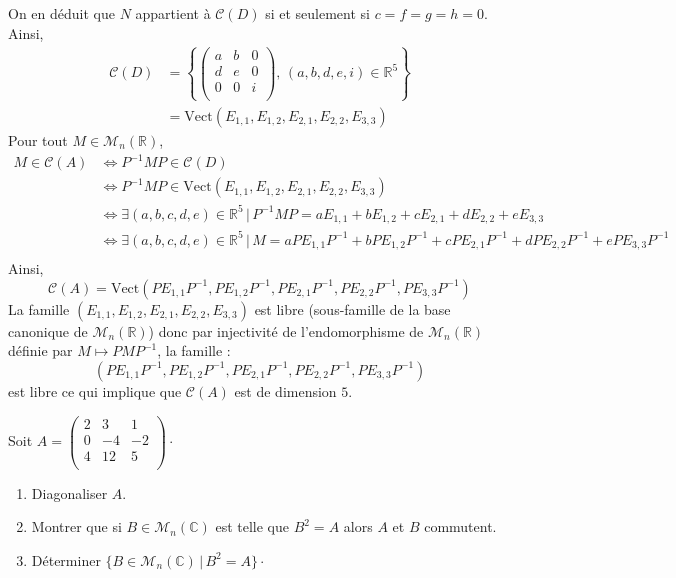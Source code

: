 \documentclass[a4paper,10pt]{report}
\begin{document}
\begin{enumerate}
On en déduit que $N$ appartient à $\mathcal{C}(D)$ si et seulement si $c=f=g=h=0$. Ainsi,
\begin{align*}
\mathcal{C}(D) & = \left\lbrace \begin{pmatrix}
a & b & 0 \\
d & e & 0 \\
0 & 0 & i \\
\end{pmatrix}, \, (a,b,d,e,i) \in \mathbb{R}^5 \right\rbrace \\
& = \textrm{Vect}(E_{1,1}, E_{1,2}, E_{2,1}, E_{2,2},E_{3,3})
\end{align*}
Pour tout $M \in \mathcal{M}_n(\mathbb{R})$,
\begin{align*}
M \in \mathcal{C}(A) & \Longleftrightarrow P^{-1}MP \in \mathcal{C}(D) \\
& \Longleftrightarrow  P^{-1}MP \in \textrm{Vect}(E_{1,1}, E_{1,2}, E_{2,1}, E_{2,2},E_{3,3}) \\
& \Longleftrightarrow \exists (a,b,c,d,e) \in \mathbb{R}^5 \, \vert \, P^{-1}MP = aE_{1,1}+bE_{1,2}+c E_{2,1}+d E_{2,2}+eE_{3,3} \\
& \Longleftrightarrow \exists (a,b,c,d,e) \in \mathbb{R}^5 \, \vert \, M = aPE_{1,1}P^{-1}+bPE_{1,2}P^{-1}+c PE_{2,1}P^{-1}+d PE_{2,2}P^{-1}+ePE_{3,3}P^{-1} \\
\end{align*}
Ainsi,
$$ \mathcal{C}(A) = \textrm{Vect}(PE_{1,1}P^{-1},PE_{1,2}P^{-1},PE_{2,1}P^{-1},PE_{2,2}P^{-1},PE_{3,3}P^{-1}) $$
La famille $(E_{1,1}, E_{1,2}, E_{2,1}, E_{2,2}, E_{3,3})$ est libre (sous-famille de la base canonique de $\mathcal{M}_n(\mathbb{R})$) donc par injectivité de l'endomorphisme de $\mathcal{M}_n(\mathbb{R})$ définie par $M \mapsto PMP^{-1}$, la famille :
$$(PE_{1,1}P^{-1},PE_{1,2}P^{-1},PE_{2,1}P^{-1},PE_{2,2}P^{-1},PE_{3,3}P^{-1})$$
est libre ce qui implique que $\mathcal{C}(A)$ est de dimension $5$.

\end{enumerate}

\begin{Exercice}{} Soit $A= \begin{pmatrix}
2 & 3 & 1 \\
0 & -4 & -2 \\
4 & 12 & 5 \\
\end{pmatrix}\cdot$

\begin{enumerate}
\item Diagonaliser $A$.
\item Montrer que si $B \in \mathcal{M}_n(\mathbb{C})$ est telle que $B^2=A$ alors $A$ et $B$ commutent.
\item Déterminer $\lbrace B \in \mathcal{M}_n(\mathbb{C}) \, \vert \, B^2=A \rbrace \cdot$
\end{enumerate}
\end{Exercice}
\end{document}
